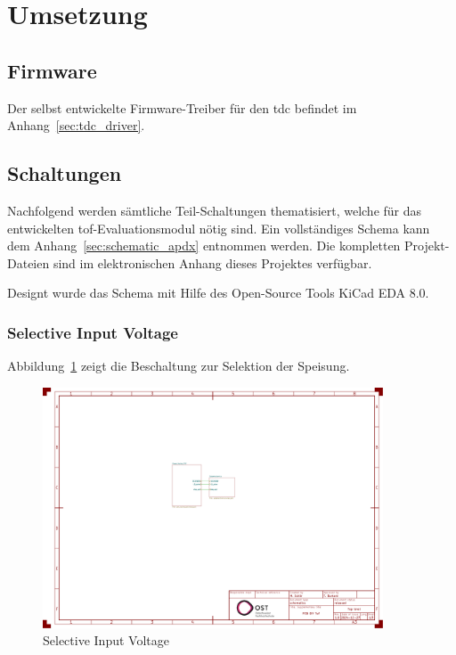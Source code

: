\documentclass[11pt,a4paper,hidelinks]{article}
\begin{document}
\section{Umsetzung}

\subsection{Firmware}

Der selbst entwickelte Firmware-Treiber für den \acrshort{tdc} befindet im Anhang~\ref{sec:tdc_driver}.

\pagebreak

\subsection{Schaltungen}
Nachfolgend werden sämtliche Teil-Schaltungen thematisiert, welche für das entwickelten \acrshort{tof}-Evaluationsmodul
nötig sind. Ein vollständiges Schema kann dem Anhang~\ref{sec:schematic_apdx} entnommen werden. Die kompletten
Projekt-Dateien sind im elektronischen Anhang dieses Projektes verfügbar.

Designt wurde das Schema mit Hilfe des Open-Source Tools \dq KiCad EDA 8.0\dq.

\subsubsection{Selective Input Voltage}

Abbildung~\ref{fig:selective_input_voltage} zeigt die Beschaltung zur Selektion der Speisung.

\begin{figure}[H]
    \centering
    \includegraphics[page=2, trim=80 590 750 50, clip, width=0.9\textwidth]{attachments/schematic.pdf}
    \caption{Selective Input Voltage}\label{fig:selective_input_voltage}
\end{figure}
\end{document}
